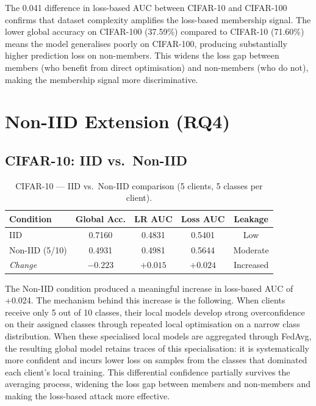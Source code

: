 \documentclass[12pt, a4paper]{report}
\begin{document}
The 0.041 difference in loss-based AUC between CIFAR-10 and CIFAR-100 confirms
that dataset complexity amplifies the loss-based membership signal. The lower
global accuracy on CIFAR-100 (37.59\%) compared to CIFAR-10 (71.60\%) means the
model generalises poorly on CIFAR-100, producing substantially higher prediction
loss on non-members. This widens the loss gap between members (who benefit from
direct optimisation) and non-members (who do not), making the membership signal
more discriminative.

\section{Non-IID Extension (RQ4)}

\subsection{CIFAR-10: IID vs.\ Non-IID}

\begin{table}[H]
  \centering
  \caption{CIFAR-10 --- IID vs.\ Non-IID comparison (5 clients, 5 classes per client).}
  \label{tab:noniid_cifar10}
  \begin{tabular}{lcccc}
    \toprule
    \textbf{Condition} & \textbf{Global Acc.} & \textbf{LR AUC} & \textbf{Loss AUC} & \textbf{Leakage} \\
    \midrule
    IID             & 0.7160 & 0.4831 & 0.5401 & Low \\
    Non-IID (5/10)  & 0.4931 & 0.4981 & 0.5644 & Moderate \\
    \midrule
    \textit{Change} & $-0.223$ & $+0.015$ & $\mathbf{+0.024}$ & Increased \\
    \bottomrule
  \end{tabular}
\end{table}

The Non-IID condition produced a meaningful increase in loss-based AUC of +0.024.
The mechanism behind this increase is the following. When clients receive only
5 out of 10 classes, their local models develop strong overconfidence on their
assigned classes through repeated local optimisation on a narrow class distribution.
When these specialised local models are aggregated through FedAvg, the resulting
global model retains traces of this specialisation: it is systematically more
confident and incurs lower loss on samples from the classes that dominated each
client's local training. This differential confidence partially survives the
averaging process, widening the loss gap between members and non-members and
making the loss-based attack more effective.
\end{document}
